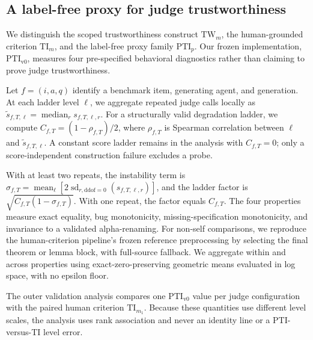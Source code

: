 
\subsection{A label-free proxy for judge trustworthiness}

We distinguish the scoped trustworthiness construct $\mathrm{TW}_m$, the human-grounded criterion $\mathrm{TI}_m$, and the label-free proxy family $\mathrm{PTI}_p$.
Our frozen implementation, $\mathrm{PTI}_{\mathrm{v0}}$, measures four pre-specified behavioral diagnostics rather than claiming to prove judge trustworthiness.

Let $f=(i,a,q)$ identify a benchmark item, generating agent, and generation.
At each ladder level $\ell$, we aggregate repeated judge calls locally as $\widetilde{s}_{f,T,\ell}=\operatorname{median}_r s_{f,T,\ell,r}$.
For a structurally valid degradation ladder, we compute $C_{f,T}=(1-\rho_{f,T})/2$, where $\rho_{f,T}$ is Spearman correlation between $\ell$ and $\widetilde{s}_{f,T,\ell}$.
A constant score ladder remains in the analysis with $C_{f,T}=0$; only a score-independent construction failure excludes a probe.

With at least two repeats, the instability term is $\sigma_{f,T}=\operatorname{mean}_{\ell}\!\left[2\operatorname{sd}_{r,\mathrm{ddof}=0}(s_{f,T,\ell,r})\right]$, and the ladder factor is $\sqrt{C_{f,T}(1-\sigma_{f,T})}$.
With one repeat, the factor equals $C_{f,T}$.
The four properties measure exact equality, bug monotonicity, missing-specification monotonicity, and invariance to a validated alpha-renaming.
For non-self comparisons, we reproduce the human-criterion pipeline's frozen reference preprocessing by selecting the final theorem or lemma block, with full-source fallback.
We aggregate within and across properties using exact-zero-preserving geometric means evaluated in log space, with no epsilon floor.

The outer validation analysis compares one $\mathrm{PTI}_{\mathrm{v0}}$ value per judge configuration with the paired human criterion $\mathrm{TI}_{m_1}$.
Because these quantities use different level scales, the analysis uses rank association and never an identity line or a PTI-versus-TI level error.


